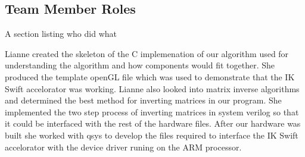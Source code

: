 \subsection{Team Member Roles}
A section listing who did what

Lianne created the skeleton of the C implemenation of our algorithm used 
for understanding the algorithm and how components would fit together. She 
produced the template openGL file which was used to demonstrate that the 
IK Swift accelorator was working. Lianne also looked into matrix inverse 
algorithms and determined the best method for inverting matrices in our 
program. She implemented the two step process of inverting matrices in 
system verilog so that it could be interfaced with the rest of the 
hardware files. After our hardware was built she worked with qsys to 
develop the files required to interface the IK Swift accelorator with 
the device driver runing on the ARM processor. 
